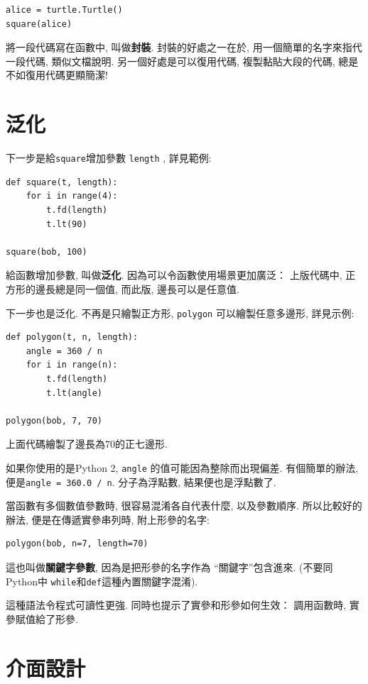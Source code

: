 \documentclass[10pt]{book}
\begin{document}
\begin{verbatim}
alice = turtle.Turtle()
square(alice)
\end{verbatim}
%
將一段代碼寫在函數中, 叫做{\bf 封裝}. 
封裝的好處之一在於, 用一個簡單的名字來指代一段代碼, 類似文檔說明. 
另一個好處是可以復用代碼, 複製黏貼大段的代碼, 總是
不如復用代碼更顯簡潔!


\section{泛化}

下一步是給{\tt square}增加參數 {\tt length} , 詳見範例:

\begin{verbatim}
def square(t, length):
    for i in range(4):
        t.fd(length)
        t.lt(90)

square(bob, 100)
\end{verbatim}
%
給函數增加參數, 叫做{\bf 泛化}. 
因為可以令函數使用場景更加廣泛：
上版代碼中, 正方形的邊長總是同一個值, 
而此版, 邊長可以是任意值.

下一步也是泛化. 
不再是只繪製正方形, {\tt polygon} 可以繪製任意多邊形, 詳見示例:

\begin{verbatim}
def polygon(t, n, length):
    angle = 360 / n
    for i in range(n):
        t.fd(length)
        t.lt(angle)

polygon(bob, 7, 70)
\end{verbatim}
%
上面代碼繪製了邊長為70的正七邊形. 

如果你使用的是Python 2, {\tt angle} 的值可能因為整除而出現偏差. 
有個簡單的辦法, 便是{\tt angle = 360.0 / n}. 分子為浮點數, 結果便也是浮點數了. 

當函數有多個數值參數時, 很容易混淆各自代表什麼, 以及參數順序. 
所以比較好的辦法, 便是在傳遞實參串列時, 附上形參的名字:

\begin{verbatim}
polygon(bob, n=7, length=70)
\end{verbatim}
%
這也叫做{\bf 關鍵字參數}, 因為是把形參的名字作為 ``關鍵字''包含進來. 
(不要同Python中 {\tt while}和{\tt def}這種內置關鍵字混淆). 

這種語法令程式可讀性更強. 同時也提示了實參和形參如何生效：
調用函數時, 實參賦值給了形參. 


\section{介面設計}
\end{document}
